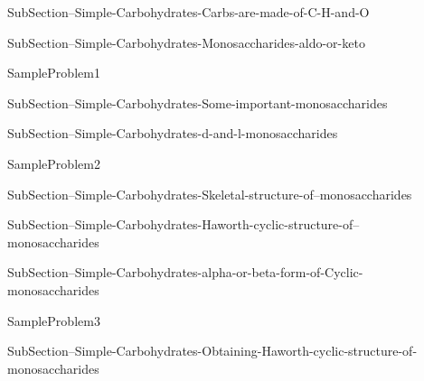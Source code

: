 \documentclass[main.tex]{subfiles}
\begin{document}
\sloppy\begin{description}


\item[] 
{SubSection--Simple-Carbohydrates-Carbs-are-made-of-C-H-and-O}









\item[] {SubSection--Simple-Carbohydrates-Monosaccharides-aldo-or-keto}





  {SampleProblem1}


\item[] {SubSection--Simple-Carbohydrates-Some-important-monosaccharides}



\item[] {SubSection--Simple-Carbohydrates-d-and-l-monosaccharides}



  {SampleProblem2}





\item[] {SubSection--Simple-Carbohydrates-Skeletal-structure-of--monosaccharides}





\item[] {SubSection--Simple-Carbohydrates-Haworth-cyclic-structure-of--monosaccharides}




\item[] {SubSection--Simple-Carbohydrates-alpha-or-beta-form-of-Cyclic-monosaccharides}




  {SampleProblem3}


\item[] {SubSection--Simple-Carbohydrates-Obtaining-Haworth-cyclic-structure-of-monosaccharides}











\end{description}
\end{document}
